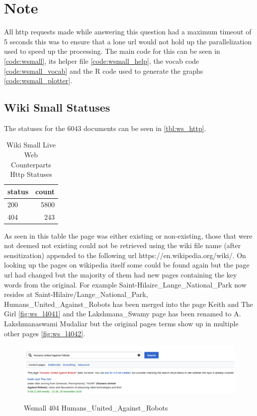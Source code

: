 \documentclass[11pt]{article}
\begin{document}
\section*{Note}
All http requests made while answering this question had a maximum timeout of 5 seconds this was to ensure that a lone url would not hold up the parallelization used to speed up the processing. The main code for this can be seen in \autoref{code:wsmall}, its helper file \autoref{code:wsmall_help}, the vocab code \autoref{code:wsmall_vocab} and the R code used to generate the graphs \autoref{code:wsmall_plotter}. 
\subsection*{Wiki Small Statuses} 
The statuses for the 6043 documents can be seen in \autoref{tbl:ws_http}. 
\begin{table}[H]
	\caption{Wiki Small Live Web Counterparts Http Statuses}
	\label{tbl:ws_http}
	\centering
\begin{tabular}{lr}
\hline
status & count \\
\hline
200 &  5800\\
404 &  243\\
\hline
\end{tabular}
\end{table}
\noindent As seen in this table the page was either existing or non-existing, those that were not deemed not existing could not be retrieved using the wiki file name (after sensitization) appended to  the following url https://en.wikipedia.org/wiki/. On looking up the pages on wikipedia itself some could be found again but the page url had changed but the majority of them had new pages containing the key words from the original. For example Saint-Hilaire\_Lange\_National\_Park now resides at Saint-Hilaire/Lange\_National\_Park, Humans\_United\_Against\_Robots has been merged into the page Keith and The Girl \autoref{fig:ws_l4041} and the Lakshmana\_Swamy page has been renamed to A. Lakshmanaswami Mudaliar but the original pages terms show up in multiple other pages \autoref{fig:ws_l4042}.
\begin{figure}[H]
\centering
{\includegraphics[scale=0.8]{wsmall_live2_404.png}}
\caption{Wsmall 404  Humans\_United\_Against\_Robots}
\label{fig:ws_l4041}
\end{figure}
\end{document}
